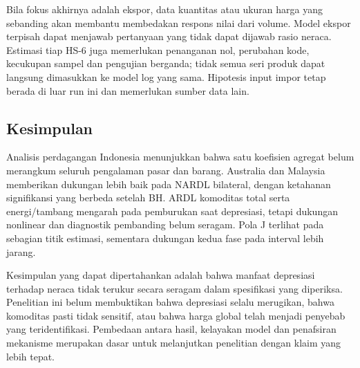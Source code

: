 Bila fokus akhirnya adalah ekspor, data kuantitas atau ukuran harga yang sebanding akan membantu membedakan respons nilai dari volume. Model ekspor terpisah dapat menjawab pertanyaan yang tidak dapat dijawab rasio neraca. Estimasi tiap HS-6 juga memerlukan penanganan nol, perubahan kode, kecukupan sampel dan pengujian berganda; tidak semua seri produk dapat langsung dimasukkan ke model log yang sama. Hipotesis input impor tetap berada di luar run ini dan memerlukan sumber data lain.

\subsection{Kesimpulan}
Analisis perdagangan Indonesia menunjukkan bahwa satu koefisien agregat belum merangkum seluruh pengalaman pasar dan barang. Australia dan Malaysia memberikan dukungan lebih baik pada NARDL bilateral, dengan ketahanan signifikansi yang berbeda setelah BH. ARDL komoditas total serta energi/tambang mengarah pada pemburukan saat depresiasi, tetapi dukungan nonlinear dan diagnostik pembanding belum seragam. Pola J terlihat pada sebagian titik estimasi, sementara dukungan kedua fase pada interval lebih jarang.

Kesimpulan yang dapat dipertahankan adalah bahwa manfaat depresiasi terhadap neraca tidak terukur secara seragam dalam spesifikasi yang diperiksa. Penelitian ini belum membuktikan bahwa depresiasi selalu merugikan, bahwa komoditas pasti tidak sensitif, atau bahwa harga global telah menjadi penyebab yang teridentifikasi. Pembedaan antara hasil, kelayakan model dan penafsiran mekanisme merupakan dasar untuk melanjutkan penelitian dengan klaim yang lebih tepat.
